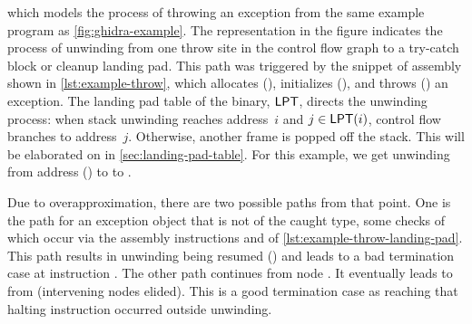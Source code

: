 which models the process of throwing an exception from the same example program as \cref{fig:ghidra-example}.
The representation in the figure indicates the process of unwinding from one throw site in the control flow graph to a try-catch block or cleanup landing pad.
This path was triggered by the snippet of assembly shown in \cref{lst:example-throw}, which allocates (), initializes (), and throws () an exception.
The landing pad table of the binary, $\operatorname{\mathsf{LPT}}$, directs the unwinding process:
when stack unwinding reaches address~$i$ and $j\in\operatorname{\mathsf{LPT}}(i)$,
control flow branches to address~$j$.
Otherwise, another frame is popped off the stack.
This will be elaborated on in \cref{sec:landing-pad-table}.
For this example, we get unwinding from address () to  to .

Due to overapproximation, there are two possible paths from that point.
One is the path for an exception object that is not of the caught type,
some checks of which occur via the assembly instructions  and  of \cref{lst:example-throw-landing-pad}.
This path results in unwinding being resumed () and leads to a bad termination case at instruction .
The other path continues from node .
It eventually leads to  from  (intervening nodes elided).
This is a good termination case as reaching that halting instruction occurred outside unwinding.

